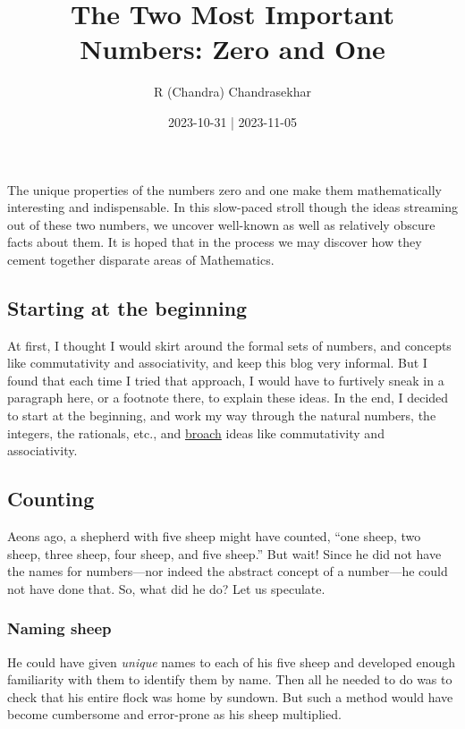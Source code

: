 \documentclass[
  a4paper,
]{article}
\title{The Two Most Important Numbers: Zero and One}
\author{R (Chandra) Chandrasekhar}
\date{2023-10-31 | 2023-11-05}
\begin{document}
\maketitle

\thispagestyle{empty}


The unique properties of the numbers zero and one make them
mathematically interesting and indispensable. In this slow-paced stroll
though the ideas streaming out of these two numbers, we uncover
well-known as well as relatively obscure facts about them. It is hoped
that in the process we may discover how they cement together disparate
areas of Mathematics.

\hypertarget{starting-at-the-beginning}{%
\subsection{Starting at the beginning}\label{starting-at-the-beginning}}

At first, I thought I would skirt around the formal sets of numbers, and
concepts like commutativity and associativity, and keep this blog very
informal. But I found that each time I tried that approach, I would have
to furtively sneak in a paragraph here, or a footnote there, to explain
these ideas. In the end, I decided to start at the beginning, and work
my way through the natural numbers, the integers, the rationals, etc.,
and \href{https://www.thefreedictionary.com/broach}{broach} ideas like
commutativity and associativity.

\hypertarget{counting}{%
\subsection{Counting}\label{counting}}

Aeons ago, a shepherd with five sheep might have counted, ``one sheep,
two sheep, three sheep, four sheep, and five sheep.'' But wait! Since he
did not have the names for numbers---nor indeed the abstract concept of
a number---he could not have done that. So, what did he do? Let us
speculate.

\hypertarget{naming-sheep}{%
\subsubsection{Naming sheep}\label{naming-sheep}}

He could have given \emph{unique} names to each of his five sheep and
developed enough familiarity with them to identify them by name. Then
all he needed to do was to check that his entire flock was home by
sundown. But such a method would have become cumbersome and error-prone
as his sheep multiplied.
\end{document}

